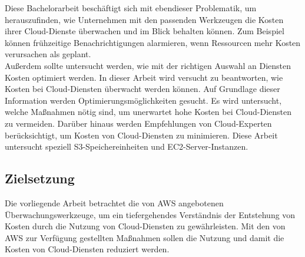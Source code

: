 \begin{flushleft}
Diese Bachelorarbeit beschäftigt sich mit ebendieser Problematik, um herauszufinden, wie Unternehmen mit den passenden Werkzeugen die Kosten ihrer Cloud-Dienste überwachen und im Blick behalten können. Zum Beispiel können frühzeitige Benachrichtigungen alarmieren, wenn Ressourcen mehr Kosten verursachen als geplant.
\\
Außerdem sollte untersucht werden, wie mit der richtigen Auswahl an Diensten Kosten optimiert werden. 
In dieser Arbeit wird versucht zu beantworten, wie Kosten bei Cloud-Diensten überwacht werden können. Auf Grundlage dieser Information werden
Optimierungsmöglichkeiten gesucht. Es wird untersucht, welche Maßnahmen nötig sind, um unerwartet hohe Kosten bei Cloud-Diensten zu vermeiden. Darüber hinaus werden Empfehlungen von Cloud-Experten berücksichtigt, um Kosten von Cloud-Diensten zu minimieren. Diese Arbeit untersucht speziell S3-Speichereinheiten und EC2-Server-Instanzen.
\end{flushleft}


\subsection{Zielsetzung}
Die vorliegende Arbeit betrachtet die von AWS angebotenen Überwachungswerkzeuge, um ein tiefergehendes Verständnis der Entstehung von Kosten durch die Nutzung von Cloud-Diensten zu gewährleisten. Mit den von AWS zur Verfügung gestellten Maßnahmen sollen die Nutzung und damit die Kosten von Cloud-Diensten reduziert werden.

